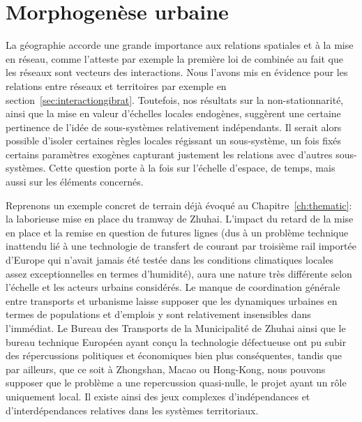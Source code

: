 



\chapter{Morphogenèse urbaine}

\label{ch:morphogenesis} %





La géographie accorde une grande importance aux relations spatiales et à la mise en réseau, comme l'atteste par exemple la première loi de  combinée au fait que les réseaux sont vecteurs des interactions. Nous l'avons mis en évidence pour les relations entre réseaux et territoires par exemple en section~\ref{sec:interactiongibrat}. Toutefois, nos résultats sur la non-stationnarité, ainsi que la mise en valeur d'échelles locales endogènes, suggèrent une certaine pertinence de l'idée de sous-systèmes relativement indépendants. Il serait alors possible d'isoler certaines règles locales régissant un sous-système, un fois fixés certains paramètres exogènes capturant justement les relations avec d'autres sous-systèmes. Cette question porte à la fois sur l'échelle d'espace, de temps, mais aussi sur les éléments concernés.

Reprenons un exemple concret de terrain déjà évoqué au Chapitre~\ref{ch:thematic}: la laborieuse mise en place du tramway de Zhuhai. L'impact du retard de la mise en place et la remise en question de futures lignes (dus à un problème technique inattendu lié à une technologie de transfert de courant par troisième rail importée d'Europe qui n'avait jamais été testée dans les conditions climatiques locales assez exceptionnelles en termes d'humidité), aura une nature très différente selon l'échelle et les acteurs urbains considérés. Le manque de coordination générale entre transports et urbanisme laisse supposer que les dynamiques urbaines en termes de populations et d'emplois y sont relativement insensibles dans l'immédiat. Le Bureau des Transports de la Municipalité de Zhuhai ainsi que le bureau technique Européen ayant conçu la technologie défectueuse ont pu subir des répercussions politiques et économiques bien plus conséquentes, tandis que par ailleurs, que ce soit à Zhongshan, Macao ou Hong-Kong, nous pouvons supposer que le problème a une repercussion quasi-nulle, le projet ayant un rôle uniquement local. Il existe ainsi des jeux complexes d'indépendances et d'interdépendances relatives dans les systèmes territoriaux.



